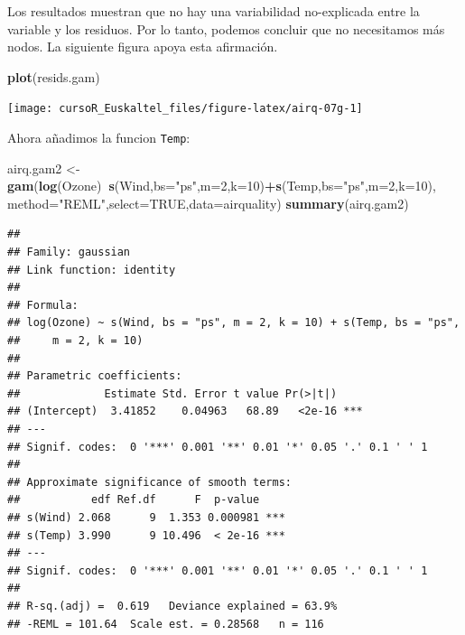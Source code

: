 \documentclass[]{book}
\newenvironment{Shaded}{\begin{snugshade}}{\end{snugshade}}
\newcommand{\KeywordTok}[1]{\textcolor[rgb]{0.13,0.29,0.53}{\textbf{#1}}}
\newcommand{\DataTypeTok}[1]{\textcolor[rgb]{0.13,0.29,0.53}{#1}}
\newcommand{\DecValTok}[1]{\textcolor[rgb]{0.00,0.00,0.81}{#1}}
\newcommand{\StringTok}[1]{\textcolor[rgb]{0.31,0.60,0.02}{#1}}
\newcommand{\OtherTok}[1]{\textcolor[rgb]{0.56,0.35,0.01}{#1}}
\newcommand{\OperatorTok}[1]{\textcolor[rgb]{0.81,0.36,0.00}{\textbf{#1}}}
\newcommand{\NormalTok}[1]{#1}
\begin{document}
Los resultados muestran que no hay una variabilidad no-explicada entre
la variable y los residuos. Por lo tanto, podemos concluir que no
necesitamos más nodos. La siguiente figura apoya esta afirmación.

\begin{Shaded}
\begin{Highlighting}[]
\KeywordTok{plot}\NormalTok{(resids.gam)}
\end{Highlighting}
\end{Shaded}

\begin{center}\texttt{[image: cursoR\_Euskaltel\_files/figure-latex/airq-07g-1]} \end{center}

Ahora añadimos la funcion \texttt{Temp}:

\begin{Shaded}
\begin{Highlighting}[]
\NormalTok{airq.gam2 <-}\StringTok{ }\KeywordTok{gam}\NormalTok{(}\KeywordTok{log}\NormalTok{(Ozone)}\OperatorTok{~}\KeywordTok{s}\NormalTok{(Wind,}\DataTypeTok{bs=}\StringTok{"ps"}\NormalTok{,}\DataTypeTok{m=}\DecValTok{2}\NormalTok{,}\DataTypeTok{k=}\DecValTok{10}\NormalTok{)}\OperatorTok{+}\KeywordTok{s}\NormalTok{(Temp,}\DataTypeTok{bs=}\StringTok{"ps"}\NormalTok{,}\DataTypeTok{m=}\DecValTok{2}\NormalTok{,}\DataTypeTok{k=}\DecValTok{10}\NormalTok{),}
                 \DataTypeTok{method=}\StringTok{"REML"}\NormalTok{,}\DataTypeTok{select=}\OtherTok{TRUE}\NormalTok{,}\DataTypeTok{data=}\NormalTok{airquality)}
\KeywordTok{summary}\NormalTok{(airq.gam2)}
\end{Highlighting}
\end{Shaded}

\begin{verbatim}
## 
## Family: gaussian 
## Link function: identity 
## 
## Formula:
## log(Ozone) ~ s(Wind, bs = "ps", m = 2, k = 10) + s(Temp, bs = "ps", 
##     m = 2, k = 10)
## 
## Parametric coefficients:
##             Estimate Std. Error t value Pr(>|t|)    
## (Intercept)  3.41852    0.04963   68.89   <2e-16 ***
## ---
## Signif. codes:  0 '***' 0.001 '**' 0.01 '*' 0.05 '.' 0.1 ' ' 1
## 
## Approximate significance of smooth terms:
##           edf Ref.df      F  p-value    
## s(Wind) 2.068      9  1.353 0.000981 ***
## s(Temp) 3.990      9 10.496  < 2e-16 ***
## ---
## Signif. codes:  0 '***' 0.001 '**' 0.01 '*' 0.05 '.' 0.1 ' ' 1
## 
## R-sq.(adj) =  0.619   Deviance explained = 63.9%
## -REML = 101.64  Scale est. = 0.28568   n = 116
\end{verbatim}
\end{document}
